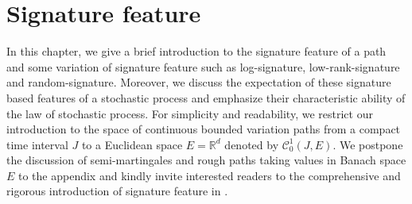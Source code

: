 \documentclass[12pt]{report}
\theoremstyle{definition}
\theoremstyle{remark}
\newcommand{\R}{\mathbb{R}}
\begin{document}
\chapter{Signature feature}
In this chapter, we give a brief introduction to the signature feature of a path and some variation of signature feature such as log-signature, low-rank-signature and random-signature. Moreover, we discuss the expectation of these signature based features of a stochastic process and emphasize their characteristic ability of the law of stochastic process. For simplicity and readability, we restrict our introduction to the space of continuous bounded variation paths from a compact time interval $J$ to a Euclidean space $E = \R^{d}$ denoted by $\mathcal{C}^{1}_{0}(J,E)$. We postpone the discussion of semi-martingales and rough paths taking values in Banach space $E$ to the appendix and kindly invite interested readers to the comprehensive and rigorous introduction of signature feature in \cite{friz2020course} \cite{lyons2007differential}.  
\end{document}
